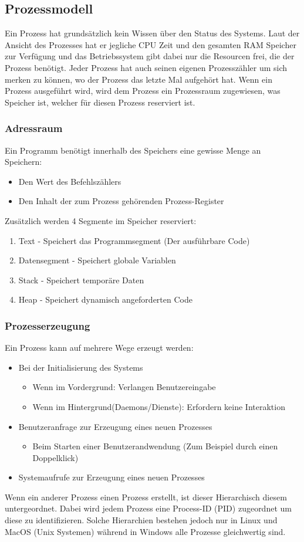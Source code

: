 \documentclass{article}
\begin{document}
	\subsection{Prozessmodell}
	Ein Prozess hat grundsätzlich kein Wissen über den Status des Systems. Laut der Ansicht des Prozesses hat er jegliche CPU Zeit und den gesamten RAM Speicher zur Verfügung und das Betriebssystem gibt dabei nur die Resourcen frei, die der Prozess benötigt. Jeder Prozess hat auch seinen eigenen Prozesszähler um sich merken zu können, wo der Prozess das letzte Mal aufgehört hat. Wenn ein Prozess ausgeführt wird, wird dem Prozess ein Prozessraum zugewiesen, was Speicher ist, welcher für diesen Prozess reserviert ist.
	\subsubsection{Adressraum}
	Ein Programm benötigt innerhalb des Speichers eine gewisse Menge an Speichern:
	\begin{itemize}
		\item{Den Wert des Befehlszählers}
		\item{Den Inhalt der zum Prozess gehörenden Prozess-Register}
	\end{itemize}
	Zusätzlich werden 4 Segmente im Speicher reserviert:
	\begin{enumerate}
		\item{Text - Speichert das Programmsegment (Der ausführbare Code)}
		\item{Datensegment - Speichert globale Variablen}
		\item{Stack - Speichert temporäre Daten}
		\item{Heap - Speichert dynamisch angeforderten Code}
	\end{enumerate}
	\subsubsection{Prozesserzeugung}
	Ein Prozess kann auf mehrere Wege erzeugt werden:
	\begin{itemize}
		\item{Bei der Initialisierung des Systems}
		\begin{itemize}
			\item{Wenn im Vordergrund: Verlangen Benutzereingabe}
			\item{Wenn im Hintergrund(Daemons/Dienste): Erfordern keine Interaktion}
		\end{itemize}
		\item{Benutzeranfrage zur Erzeugung eines neuen Prozesses}
		\begin{itemize}
			\item{Beim Starten einer Benutzerandwendung (Zum Beispiel durch einen Doppelklick)}
		\end{itemize}
		\item{Systemaufrufe zur Erzeugung eines neuen Prozesses}
	\end{itemize}
	Wenn ein anderer Prozess einen Prozess erstellt, ist dieser Hierarchisch diesem untergeordnet. Dabei wird jedem Prozess eine Process-ID (PID) zugeordnet um diese zu identifizieren. Solche Hierarchien bestehen jedoch nur in Linux und MacOS (Unix Systemen) während in Windows alle Prozesse gleichwertig sind.
\end{document}

